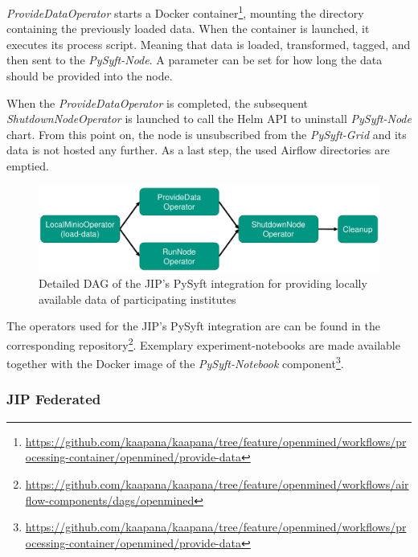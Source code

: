 \textit{ProvideDataOperator} starts a Docker container\footnote{\url{https://github.com/kaapana/kaapana/tree/feature/openmined/workflows/processing-container/openmined/provide-data}}, mounting the directory containing the previously loaded data. When the container is launched, it executes its process script. Meaning that data is loaded, transformed, tagged, and then sent to the \textit{PySyft-Node}. A parameter can be set for how long the data should be provided into the node.

When the \textit{ProvideDataOperator} is completed, the subsequent \textit{ShutdownNodeOperator} is launched to call the Helm API to uninstall \textit{PySyft-Node} chart.
From this point on, the node is unsubscribed from the \textit{PySyft-Grid} and its data is not hosted any further. As a last step, the used Airflow directories are emptied.

\begin{figure}[htbp!]
    \centerline{\includegraphics[width=1\textwidth]{1_Figures/DAG_PySyft.pdf}}
    \caption[Detailed illustration of DAG for the JIP's PySyft integration]{Detailed DAG of the JIP's PySyft integration for providing locally available data of participating institutes}
\label{fig:DetailedDAG_PySyft}
\end{figure}

The operators used for the JIP's PySyft integration are can be found in the corresponding repository\footnote{\url{https://github.com/kaapana/kaapana/tree/feature/openmined/workflows/airflow-components/dags/openmined}}.
Exemplary experiment-notebooks are made available together with the Docker image of the \textit{PySyft-Notebook} component\footnote{\url{https://github.com/kaapana/kaapana/tree/feature/openmined/workflows/processing-container/openmined/provide-data}}.



\subsubsection{JIP Federated}
\label{subsubsec:JIPFederated}

